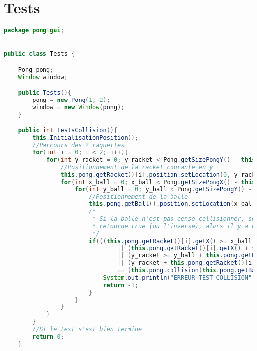 \section{Tests}
\begin{lstlisting}[language=Java]
package pong.gui;


public class Tests {

	Pong pong;
	Window window;

	public Tests(){
		pong = new Pong(1, 2);
		window = new Window(pong);
	}

	public int TestsCollision(){
		this.InitialisationPosition();
		//Parcours des 2 raquettes
		for(int i = 0; i < 2; i++){
			for(int y_racket = 0; y_racket < Pong.getSizePongY() - this.pong.getRacket()[0].height; y_racket++){
				//Positionnement de la racket courante en y
				this.pong.getRacket()[i].position.setLocation(0, y_racket);
				for(int x_ball = 0; x_ball < Pong.getSizePongX() - this.pong.getBall().width; x_ball++){
					for(int y_ball = 0; y_ball < Pong.getSizePongY() - this.pong.getBall().height; y_ball++){
						//Positionnement de la balle
						this.pong.getBall().position.setLocation(x_ball, y_ball);
						/*
						 * Si la balle n'est pas cense collisionner, selon nos valeurs est que collision
						 * retourne true (ou l'inverse), alors il y a une erreur
						 */
						if(((this.pong.getRacket()[i].getX() >= x_ball + this.pong.getBall().width)
								|| (this.pong.getRacket()[i].getX() + this.pong.getRacket()[i].width <= x_ball)
								|| (y_racket >= y_ball + this.pong.getBall().height) 
								|| (y_racket + this.pong.getRacket()[i].height <= y_ball))
								== (this.pong.collision(this.pong.getBall(), this.pong.getRacket()[i]))){
							System.out.println("ERREUR TEST COLLISION");
							return -1;
						}
					}
				}
			}
		}
		//Si le test s'est bien termine
		return 0;	
	}


\end{lstlisting}
